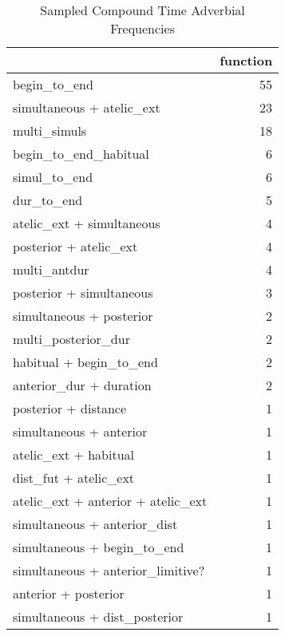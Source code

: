 \begin{table}[htbp!]
\centering
\caption{Sampled Compound Time Adverbial Frequencies}
\label{table:compound_funct_ct}
\begin{tabular}{lr}
\toprule
{} &  function \\
\midrule
begin\_to\_end                              &        55 \\
simultaneous + atelic\_ext                 &        23 \\
multi\_simuls                              &        18 \\
begin\_to\_end\_habitual                     &         6 \\
simul\_to\_end                              &         6 \\
dur\_to\_end                                &         5 \\
atelic\_ext + simultaneous                 &         4 \\
posterior + atelic\_ext                    &         4 \\
multi\_antdur                              &         4 \\
posterior + simultaneous                  &         3 \\
simultaneous + posterior                  &         2 \\
multi\_posterior\_dur                       &         2 \\
habitual + begin\_to\_end                   &         2 \\
anterior\_dur + duration                   &         2 \\
posterior + distance                      &         1 \\
simultaneous + anterior                   &         1 \\
atelic\_ext + habitual                     &         1 \\
dist\_fut + atelic\_ext                     &         1 \\
atelic\_ext + anterior + atelic\_ext        &         1 \\
simultaneous + anterior\_dist              &         1 \\
simultaneous + begin\_to\_end               &         1 \\
simultaneous + anterior\_limitive?         &         1 \\
anterior + posterior                      &         1 \\
simultaneous + dist\_posterior             &         1 \\

\end{tabular}
\end{table}
